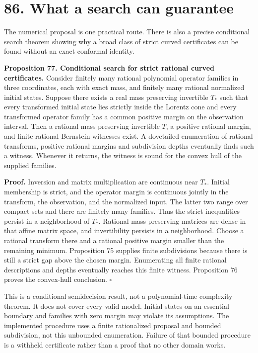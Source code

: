 \documentclass[11pt,letterpaper]{article}
\begin{document}
\section{86. What a search can
guarantee}\label{what-a-search-can-guarantee}

The numerical proposal is one practical route. There is also a precise
conditional search theorem showing why a broad class of strict curved
certificates can be found without an exact conformal identity.

\textbf{Proposition 77. Conditional search for strict rational curved
certificates.} Consider finitely many rational polynomial operator
families in three coordinates, each with exact mass, and finitely many
rational normalized initial states. Suppose there exists a real mass
preserving invertible \(T_*\) such that every transformed initial state
lies strictly inside the Lorentz cone and every transformed operator
family has a common positive margin on the observation interval. Then a
rational mass preserving invertible \(T\), a positive rational margin,
and finite rational Bernstein witnesses exist. A dovetailed enumeration
of rational transforms, positive rational margins and subdivision depths
eventually finds such a witness. Whenever it returns, the witness is
sound for the convex hull of the supplied families.

\textbf{Proof.} Inversion and matrix multiplication are continuous near
\(T_*\). Initial membership is strict, and the operator margin is
continuous jointly in the transform, the observation, and the normalized
input. The latter two range over compact sets and there are finitely
many families. Thus the strict inequalities persist in a neighborhood of
\(T_*\). Rational mass preserving matrices are dense in that affine
matrix space, and invertibility persists in a neighborhood. Choose a
rational transform there and a rational positive margin smaller than the
remaining minimum. Proposition 75 supplies finite subdivisions because
there is still a strict gap above the chosen margin. Enumerating all
finite rational descriptions and depths eventually reaches this finite
witness. Proposition 76 proves the convex-hull conclusion. \(\square\)

This is a conditional semidecision result, not a polynomial-time
complexity theorem. It does not cover every valid model. Initial states
on an essential boundary and families with zero margin may violate its
assumptions. The implemented procedure uses a finite rationalized
proposal and bounded subdivision, not this unbounded enumeration.
Failure of that bounded procedure is a withheld certificate rather than
a proof that no other domain works.
\end{document}
